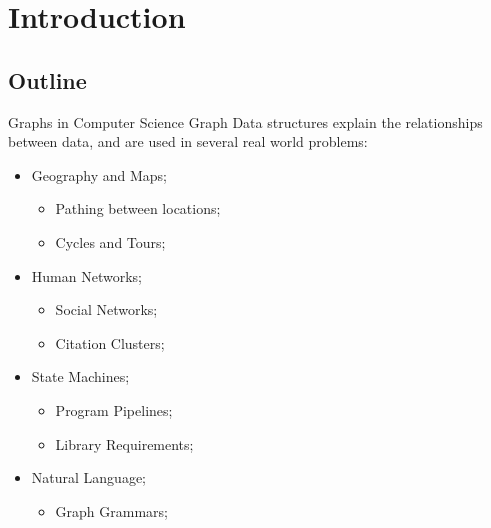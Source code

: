 \section{Introduction}
\subsection{Outline}

\begin{frame}{Graphs in Computer Science}
  Graph Data structures explain the relationships between data, and are used in several real world problems:\bigskip

  \begin{itemize}
    \item Geography and Maps;
    \begin{itemize}
      \item Pathing between locations;
      \item Cycles and Tours;
    \end{itemize}
    \item Human Networks;
    \begin{itemize}
      \item Social Networks;
      \item Citation Clusters;
    \end{itemize}
    \item State Machines;
    \begin{itemize}
      \item Program Pipelines;
      \item Library Requirements;
    \end{itemize}
    \item Natural Language;
    \begin{itemize}
      \item Graph Grammars;
    \end{itemize}
  \end{itemize}
\end{frame}

